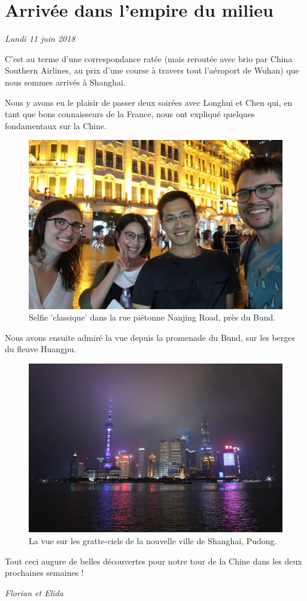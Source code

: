 \hypertarget{arrivuxe9e-dans-lempire-du-milieu}{%
\section{Arrivée dans l'empire du
milieu}\label{arrivuxe9e-dans-lempire-du-milieu}}

\emph{Lundi 11 juin 2018}

C'est au terme d'une correspondance ratée (mais reroutée avec brio par
China Southern Airlines, au prix d'une course à travers tout l'aéroport
de Wuhan) que nous sommes arrivés à Shanghai.

Nous y avons eu le plaisir de passer deux soirées avec Longhui et Chen
qui, en tant que bons connaisseurs de la France, nous ont expliqué
quelques fondamentaux sur la Chine.

\begin{figure}
\centering
\includegraphics{images/20180611_shanghai.JPG}
\caption{Selfie 'classique' dans la rue piétonne Nanjing Road, près du
Bund.}
\end{figure}

Nous avons ensuite admiré la vue depuis la promenade du Bund, sur les
berges du fleuve Huangpu.

\begin{figure}
\centering
\includegraphics{images/20180611_bund.JPG}
\caption{La vue sur les gratte-ciels de la nouvelle ville de Shanghai,
Pudong.}
\end{figure}

Tout ceci augure de belles découvertes pour notre tour de la Chine dans
les deux prochaines semaines !

\emph{Florian et Elida}


